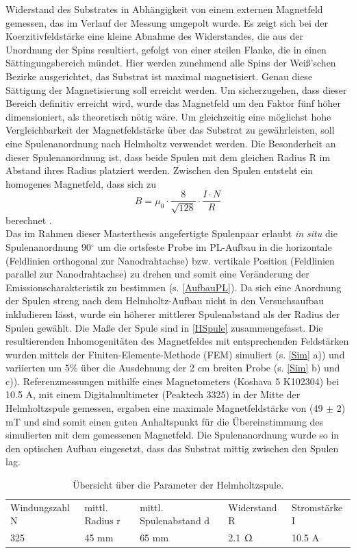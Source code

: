 Widerstand des Substrates in Abhängigkeit von einem externen Magnetfeld
gemessen, das im Verlauf der Messung umgepolt wurde. Es zeigt sich bei der
Koerzitivfeldstärke eine kleine Abnahme des Widerstandes, die aus der Unordnung
der Spins resultiert, gefolgt von einer steilen Flanke, die in einen
Sättingungsbereich mündet. Hier werden zunehmend alle Spins der Weiß'schen
Bezirke ausgerichtet, das Substrat ist maximal magnetisiert. Genau diese
Sättigung der Magnetisierung soll erreicht werden. Um sicherzugehen, dass dieser
Bereich definitiv erreicht wird, wurde das Magnetfeld um den Faktor fünf höher
dimensioniert, als theoretisch nötig wäre. Um gleichzeitig eine möglichst hohe
Vergleichbarkeit der Magnetfeldstärke über das Substrat zu gewährleisten, soll
eine Spulenanordnung nach Helmholtz verwendet werden. Die Besonderheit an dieser
Spulenanordnung ist, dass beide Spulen mit dem gleichen Radius R im Abstand
ihres Radius platziert werden. Zwischen den Spulen entsteht ein homogenes
Magnetfeld, dass sich zu \begin{equation} B=\mu_0 \cdot \frac{8}{\sqrt{128}}
\cdot \frac{I \cdot N}{R} \end{equation} berechnet \cite{Demtroeder.2009}. \\
Das im Rahmen dieser Masterthesis angefertigte Spulenpaar erlaubt \textit{in
situ} die Spulenanordnung 90$^\circ$ um die ortsfeste Probe im PL-Aufbau in die
horizontale (Feldlinien orthogonal zur Nanodrahtachse) bzw. vertikale Position
(Feldlinien parallel zur Nanodrahtachse) zu drehen und somit eine Veränderung
der Emissionscharakteristik zu bestimmen (s. \autoref{AufbauPL}). Da sich eine
Anordnung der Spulen streng nach dem Helmholtz-Aufbau nicht in den
Versuchsaufbau inkludieren lässt, wurde ein höherer mittlerer Spulenabstand als
der Radius der Spulen gewählt. Die Maße der Spule sind in \autoref{HSpule}
zusammengefasst. Die resultierenden Inhomogenitäten des Magnetfeldes mit
entsprechenden Feldstärken wurden mittels der Finiten-Elemente-Methode (FEM)
simuliert (s. \autoref{Sim} a)) und variierten um 5\% über die Ausdehnung der 2
cm breiten Probe (s. \autoref{Sim} b) und c)). Referenzmessungen mithilfe eines
Magnetometers (Koshava 5 K102304) bei 10.5 A, mit einem Digitalmultimeter
(Peaktech 3325) in der Mitte der Helmholtzspule gemessen, ergaben eine maximale
Magnetfeldstärke von (49 $\pm$ 2) mT und sind somit einen guten Anhaltspunkt für
die Übereinstimmung des simulierten mit dem gemessenen Magnetfeld. Die
Spulenanordnung wurde so in den optischen Aufbau eingesetzt, dass das Substrat
mittig zwischen den Spulen lag. \begin{table}[h] \centering \begin{small}
\begin{tabular}{lllll} Windungszahl N & mittl. Radius r & mittl. Spulenabstand d
& Widerstand R & Stromstärke I\\ 325 & 45 mm & 65 mm & 2.1 $\Upomega$ & 10.5 A\\
\end{tabular} \end{small} \caption[Dimensionierung der Helmholtzspule]{Übersicht
über die Parameter der Helmholtzspule.} \label{HSpule} \end{table}
